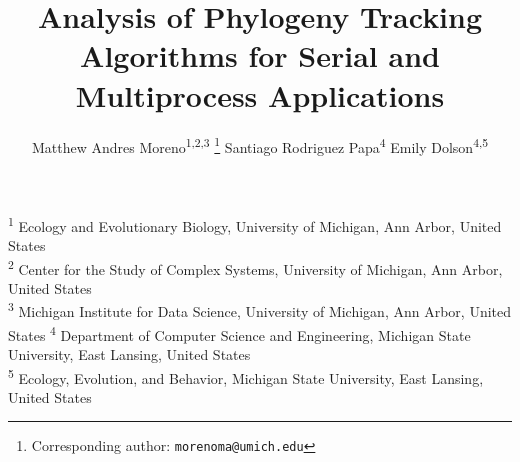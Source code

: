 \title{ Analysis of Phylogeny Tracking Algorithms for Serial and Multiprocess Applications }
\author{
    Matthew Andres Moreno\textsuperscript{1,2,3} \thanks{Corresponding author: \texttt{morenoma@umich.edu}} \quad
    Santiago Rodriguez Papa\textsuperscript{4} \quad
    Emily Dolson\textsuperscript{4,5} \quad
}
\date{}

\newcommand{\affil}[1]{\textsuperscript{#1}}
\newcommand{\affiliations}{
\affil{1} Ecology and Evolutionary Biology, University of Michigan, Ann Arbor, United States \\
\affil{2} Center for the Study of Complex Systems, University of Michigan, Ann Arbor, United States \\
\affil{3} Michigan Institute for Data Science, University of Michigan, Ann Arbor, United States
\affil{4} Department of Computer Science and Engineering, Michigan State University, East Lansing, United States \\
\affil{5} Ecology, Evolution, and Behavior, Michigan State University, East Lansing, United States \\
}

\maketitle

\begin{center}
\affiliations
\end{center}


